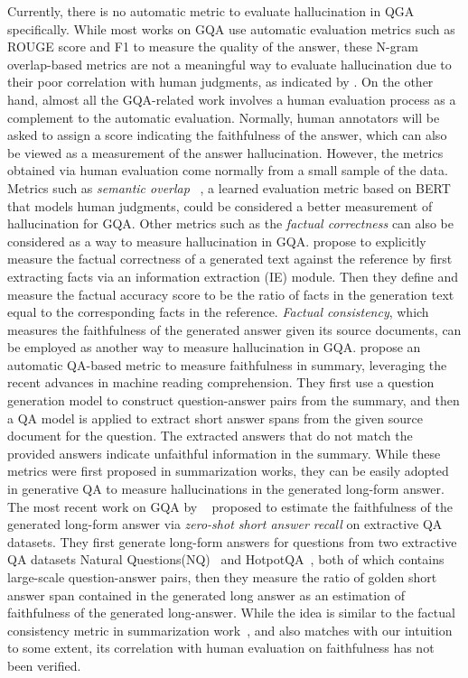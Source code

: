 Currently, there is no automatic metric to evaluate hallucination in QGA specifically. While most works on GQA use automatic evaluation metrics such as ROUGE score and F1 to measure the quality of the answer, these N-gram overlap-based metrics are not a meaningful way to evaluate hallucination due to their poor correlation with human judgments, as indicated by . On the other hand, almost all the GQA-related work involves a human evaluation process as a complement to the automatic evaluation. Normally, human annotators will be asked to assign a score indicating the faithfulness of the answer, which can also be viewed as a measurement of the answer hallucination. However, the metrics obtained via human evaluation come normally from a small sample of the data.
Metrics such as \textit{semantic overlap} ~, a learned evaluation metric based on BERT that models human judgments, could be considered a better measurement of hallucination for GQA. Other metrics such as the \textit{factual correctness} can also be considered as a way to measure hallucination in GQA.  propose to explicitly measure the factual correctness of a generated text against the reference by first extracting facts via an information extraction (IE) module. Then they define and measure the factual accuracy score to be the ratio of facts in the generation text equal to the corresponding facts in the reference. 
\textit{Factual consistency}, which measures the faithfulness of the generated answer given its source documents, can be employed as another way to measure hallucination in GQA.  propose an automatic QA-based metric to measure faithfulness in summary, leveraging the recent advances in machine reading comprehension. They first use a question generation model to construct question-answer pairs from the summary, and then a QA model is applied to extract short answer spans from the given source document for the question. The extracted answers that do not match the provided answers indicate unfaithful information in the summary. While these metrics were first proposed in summarization works, they can be easily adopted in generative QA to measure hallucinations in the generated long-form answer.
The most recent work on GQA by ~ proposed to estimate the faithfulness of the generated long-form answer via \textit{zero-shot short answer recall} on extractive QA datasets. They first generate long-form answers for questions from two extractive QA datasets Natural Questions(NQ)~ and HotpotQA~, both of which contains large-scale question-answer pairs, then they measure the ratio of golden short answer span contained in the generated long answer as an estimation of faithfulness of the generated long-answer. While the idea is similar to the factual consistency metric in summarization work~, and also matches with our intuition to some extent, its correlation with human evaluation on faithfulness has not been verified.

